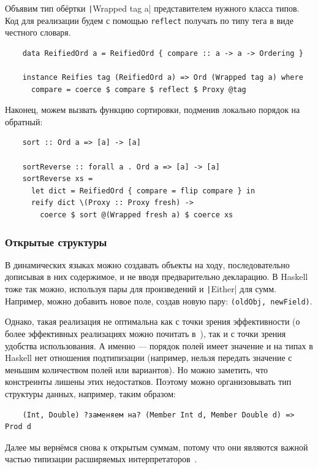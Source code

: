 Объявим тип обёртки \texttt|Wrapped tag a| представителем нужного класса типов.
Код для реализации будем с помощью \texttt{reflect} получать по типу тега в виде честного словаря.
\begin{verbatim}
    data ReifiedOrd a = ReifiedOrd { compare :: a -> a -> Ordering }

    instance Reifies tag (ReifiedOrd a) => Ord (Wrapped tag a) where
      compare = coerce $ compare $ reflect $ Proxy @tag
\end{verbatim}

Наконец, можем вызвать функцию сортировки, подменив локально порядок на обратный:
\begin{verbatim}
    sort :: Ord a => [a] -> [a]

    sortReverse :: forall a . Ord a => [a] -> [a]
    sortReverse xs =
      let dict = ReifiedOrd { compare = flip compare } in
      reify dict \(Proxy :: Proxy fresh) ->
        coerce $ sort @(Wrapped fresh a) $ coerce xs
\end{verbatim}

\subsubsection{Открытые структуры}

В динамических языках можно создавать объекты на ходу, последовательно дописывая в них содержимое, и не вводя предварительно декларацию.
В Haskell тоже так можно, используя пары для произведений и \texttt|Either| для сумм.
Например, можно добавить новое поле, создав новую пару: \texttt{(oldObj, newField)}.

Однако, такая реализация не оптимальна как с точки зрения эффективности (о более эффективных реализациях можно почитать в~\cite[глава 11]{maguire-types}), так и с точки зрения удобства использования.
А именно --- порядок полей имеет значение и на типах в Haskell нет отношения подтипизации (например, нельзя передать значение с меньшим количеством полей или вариантов).
Но можно заметить, что констреинты лишены этих недостатков.
Поэтому можно организовывать тип структуры данных, например, таким образом:
\begin{verbatim}
    (Int, Double) ?заменяем на? (Member Int d, Member Double d) => Prod d
\end{verbatim}

Далее мы вернёмся снова к открытым суммам, потому что они являются важной частью типизации расширяемых интерпретаторов~\cite{swierstra2008data}. %

